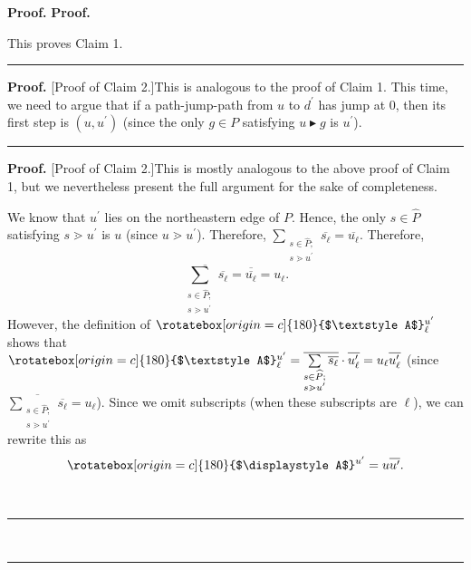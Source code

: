 \documentclass[numbers=enddot,12pt,final,onecolumn,notitlepage]{scrartcl}%
\theoremstyle{definition}
\newenvironment{verlong}{}{}
\newenvironment{vershort}{}{}
\newcommand{\upslack}{\mathchoice{\rotatebox[origin=c]{180}{$\displaystyle A$}}{\rotatebox[origin=c]{180}{$\textstyle A$}}{\rotatebox[origin=c]{180}{$\scriptstyle A$}}{\rotatebox[origin=c]{180}{$\scriptscriptstyle A$}}}
\newenvironment{proof}[1][Proof]{\noindent\textbf{#1.} }{\ \rule{0.5em}{0.5em}}
\let\sumnonlimits\sum
\renewcommand{\sum}{\sumnonlimits\limits}
\begin{document}
\begin{proof}
\begin{proof}
\begin{verlong}
\end{verlong}

\noindent This proves Claim 1.
\end{proof}

\begin{vershort}


\begin{proof}
[Proof of Claim 2.]This is analogous to the proof of Claim 1. This time, we
need to argue that if a path-jump-path from $u$ to $d^{\prime}$ has jump at
$0$, then its first step is $\left(  u,u^{\prime}\right)  $ (since the only
$g\in P$ satisfying $u\blacktriangleright g$ is $u^{\prime}$).
\end{proof}
\end{vershort}

\begin{verlong}


\begin{proof}
[Proof of Claim 2.]This is mostly analogous to the above proof of Claim 1, but
we nevertheless present the full argument for the sake of completeness.

We know that $u^{\prime}$ lies on the northeastern edge of $P$. Hence, the
only $s\in\widehat{P}$ satisfying $s\gtrdot u^{\prime}$ is $u$ (since
$u\gtrdot u^{\prime}$). Therefore, $\sum_{\substack{s\in\widehat{P};\\s\gtrdot
u^{\prime}}}\overline{s_{\ell}}=\overline{u_{\ell}}$. Therefore,%
\[
\overline{\sum_{\substack{s\in\widehat{P};\\s\gtrdot u^{\prime}}%
}\overline{s_{\ell}}}=\overline{\overline{u_{\ell}}}=u_{\ell}.
\]
However, the definition of $\upslack_{\ell}^{u^{\prime}}$ shows that
$\upslack_{\ell}^{u^{\prime}}=\overline{\sum_{\substack{s\in\widehat{P}%
;\\s\gtrdot u^{\prime}}}\overline{s_{\ell}}}\cdot\overline{u_{\ell}^{\prime}%
}=u_{\ell}\overline{u_{\ell}^{\prime}}$ (since $\overline{\sum_{\substack{s\in
\widehat{P};\\s\gtrdot u^{\prime}}}\overline{s_{\ell}}}=u_{\ell}$). Since we
omit subscripts (when these subscripts are $\ell$), we can rewrite this as
\begin{equation}
\upslack^{u^{\prime}}=u\overline{u^{\prime}}. \label{pf.lem.rect.conv.c2.pf.1}%
\end{equation}



\end{proof}
\end{verlong}
\end{proof}
\end{document}
